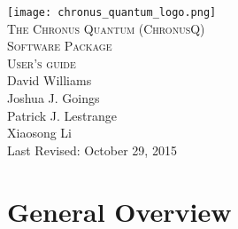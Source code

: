 \documentclass[12pt]{article}
\makeatletter
\newcommand{\XiaosongContact}{Xiaosong Li (\texttt{xsli@u.washington.edu})}
\makeatother
\begin{document}
  \begin{titlepage}
    \vspace*{\fill}
    \begin{center}
      \texttt{[image: chronus\_quantum\_logo.png]}~\\[1cm]
      \textsc{\LARGE The Chronus Quantum (ChronusQ) \\ Software Package}~\\[0.5cm]
      \textsc{\Large User's guide}~\\[5cm]
      \large David Williams\\
      \large Joshua J. Goings\\
      \large Patrick J. Lestrange\\
      \large Xiaosong Li \\[1.5cm]
      \large Last Revised: October 29, 2015
    \end{center}
    \vspace*{\fill}
  \end{titlepage}
  \tableofcontents

  \newpage

  \section{General Overview} \label{sec:GeneralOverView}

%
%
\end{document}
